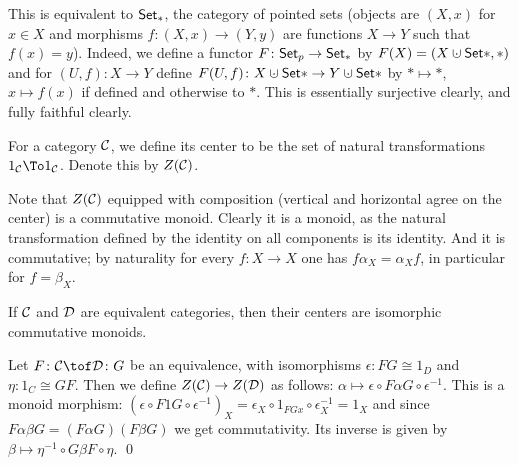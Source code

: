     This is equivalent to ${\sf Set}_*$, the category of pointed sets (objects are $(X,x)$ for $x\in X$ and morphisms $f\colon(X,x)\to(Y,y)$ are functions $X\to Y$ such that $f(x)=y$).
    Indeed, we define a functor $F\colon{\sf Set}_p\to{\sf Set}_*$ by $F(X)=(X\dcup\Set*,*)$ and for $(U,f)\colon X\to Y$ define $F(U,f)\colon X\dcup\Set*\to Y\dcup\Set*$ by $*\mapsto*$, $x\mapsto f(x)$ if defined and
    otherwise to $*$.
    This is essentially surjective clearly, and fully faithful clearly.

\eexam

\bdefn

    For a category ${{\cal C}}$, we define its {\emphcolor center} to be the set of natural transformations $1_\C\To1_\C$.
    Denote this by $Z({{\cal C}})$.

\edefn

Note that $Z({{\cal C}})$ equipped with composition (vertical and horizontal agree on the center) is a commutative monoid.
Clearly it is a monoid, as the natural transformation defined by the identity on all components is its identity.
And it is commutative; by naturality for every $f\colon X\to X$ one has $f\alpha_X=\alpha_Xf$, in particular for $f=\beta_X$.

\bprop

    If ${{\cal C}}$ and ${{\cal D}}$ are equivalent categories, then their centers are isomorphic commutative monoids.

\eprop

\bproof

    Let $F\colon\C\tof\D\colon G$ be an equivalence, with isomorphisms $\epsilon\colon FG\cong1_D$ and $\eta\colon1_C\cong GF$.
    Then we define $Z({{\cal C}})\to Z({{\cal D}})$ as follows: $\alpha\mapsto\epsilon\circ F\alpha G\circ\epsilon^{-1}$.
    This is a monoid morphism: $(\epsilon\circ F1G\circ\epsilon^{-1})_X=\epsilon_X\circ 1_{FGx}\circ\epsilon^{-1}_X=1_X$ and since $F\alpha\beta G=(F\alpha G)(F\beta G)$ we get commutativity.
    Its inverse is given by $\beta\mapsto\eta^{-1}\circ G\beta F\circ\eta$.
    \qed

\eproof

